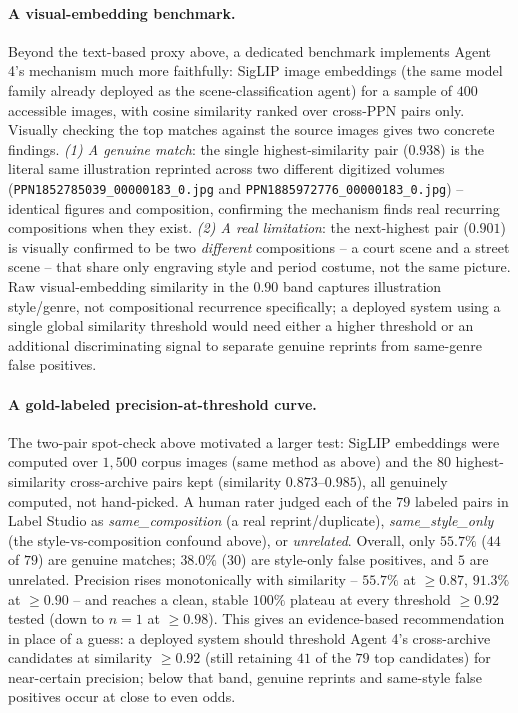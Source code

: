 \documentclass[12pt,a4paper]{report}
\begin{document}
\paragraph{A visual-embedding benchmark.} Beyond the text-based proxy above, a dedicated benchmark implements Agent 4's mechanism much more faithfully: SigLIP image embeddings (the same model family already deployed as the scene-classification agent) for a sample of $400$ accessible images, with cosine similarity ranked over cross-PPN pairs only. Visually checking the top matches against the source images gives two concrete findings. \emph{(1) A genuine match}: the single highest-similarity pair ($0.938$) is the literal same illustration reprinted across two different digitized volumes (\texttt{PPN1852785039\_00000183\_0.jpg} and \texttt{PPN1885972776\_00000183\_0.jpg}) -- identical figures and composition, confirming the mechanism finds real recurring compositions when they exist. \emph{(2) A real limitation}: the next-highest pair ($0.901$) is visually confirmed to be two \emph{different} compositions -- a court scene and a street scene -- that share only engraving style and period costume, not the same picture. Raw visual-embedding similarity in the $0.90$ band captures illustration style/genre, not compositional recurrence specifically; a deployed system using a single global similarity threshold would need either a higher threshold or an additional discriminating signal to separate genuine reprints from same-genre false positives.

\paragraph{A gold-labeled precision-at-threshold curve.} The two-pair spot-check above motivated a larger test: SigLIP embeddings were computed over $1{,}500$ corpus images (same method as above) and the $80$ highest-similarity cross-archive pairs kept (similarity $0.873$--$0.985$), all genuinely computed, not hand-picked. A human rater judged each of the $79$ labeled pairs in Label Studio as \textit{same\_composition} (a real reprint/duplicate), \textit{same\_style\_only} (the style-vs-composition confound above), or \textit{unrelated}. Overall, only $55.7\%$ ($44$ of $79$) are genuine matches; $38.0\%$ ($30$) are style-only false positives, and $5$ are unrelated. Precision rises monotonically with similarity -- $55.7\%$ at $\ge 0.87$, $91.3\%$ at $\ge 0.90$ -- and reaches a clean, stable $100\%$ plateau at every threshold $\ge 0.92$ tested (down to $n=1$ at $\ge 0.98$). This gives an evidence-based recommendation in place of a guess: a deployed system should threshold Agent 4's cross-archive candidates at similarity $\ge 0.92$ (still retaining $41$ of the $79$ top candidates) for near-certain precision; below that band, genuine reprints and same-style false positives occur at close to even odds.
\end{document}

